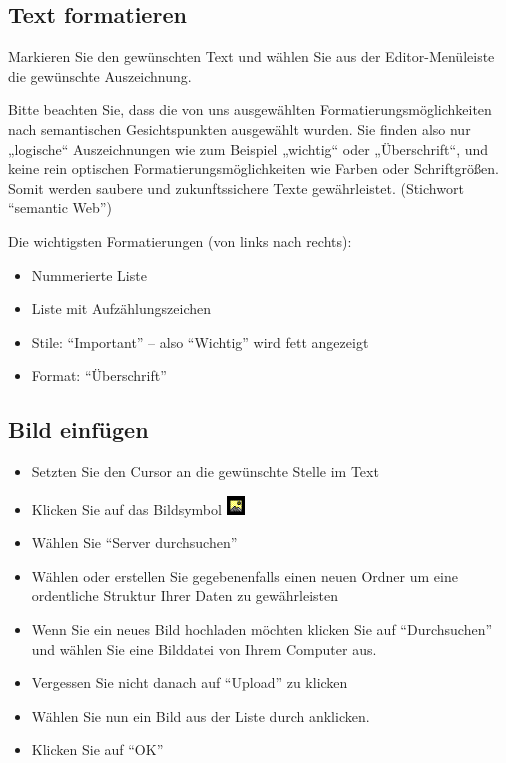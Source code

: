 \documentclass[article, a4paper, oneside, 11pt]{memoir}
\begin{document}
\subsection{Text formatieren}

Markieren Sie den gewünschten Text und wählen Sie aus der Editor-Menüleiste die gewünschte Auszeichnung.

Bitte beachten Sie, dass die von uns ausgewählten
Formatierungsmöglichkeiten nach semantischen Gesichtspunkten ausgewählt
wurden. Sie finden also nur „logische“ Auszeichnungen wie zum Beispiel
„wichtig“ oder „Überschrift“, und keine rein optischen
Formatierungsmöglichkeiten wie Farben oder Schriftgrößen. Somit werden
saubere und zukunftssichere Texte gewährleistet. (Stichwort "`semantic
Web"')

Die wichtigsten Formatierungen (von links nach rechts):

\begin{itemize}
\item Nummerierte Liste
\item Liste mit Aufzählungszeichen
\item Stile: "`Important"' -- also "`Wichtig"' wird fett angezeigt
\item Format: "`Überschrift"'
\end{itemize}


\subsection{Bild einfügen}

\begin{itemize}
\item Setzten Sie den Cursor an die gewünschte Stelle im Text
\item Klicken Sie auf das Bildsymbol \includegraphics[height=5mm]{image_icon}
\item Wählen Sie "`Server durchsuchen"'
\item Wählen oder erstellen Sie gegebenenfalls einen neuen Ordner um eine ordentliche Struktur Ihrer Daten zu gewährleisten
\item Wenn Sie ein neues Bild hochladen möchten klicken Sie auf "`Durchsuchen"' und wählen Sie eine Bilddatei von Ihrem Computer aus.
\item Vergessen Sie nicht danach auf "`Upload"' zu klicken
\item Wählen Sie nun ein Bild aus der Liste durch anklicken.
\item Klicken Sie auf "`OK"'
\end{itemize}
\end{document}
